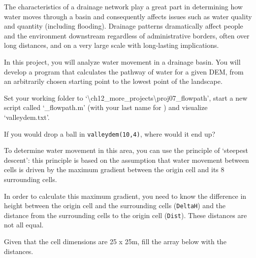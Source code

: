 \projectfooter{}



The characteristics of a drainage network play a great part in determining how water moves through a basin and consequently affects issues such as water quality and quantity (including flooding). Drainage patterns dramatically affect people and the environment downstream regardless of administrative borders, often over long distances, and on a very large scale with long-lasting implications. 

In this project, you will analyze water movement in a drainage basin. You will develop a program that calculates the pathway of water for a given DEM, from an arbitrarily chosen starting point to the lowest point of the landscape.
\begin{action}
Set your working folder to `\textbackslash{}ch12\_more\_projects\textbackslash{}proj07\_flowpath', start a new script called `\_flowpath.m' (with your last name for   ) and visualize `valleydem.txt'.
\end{action}
\begin{action}
If you would drop a ball in {\tt valleydem(10,4)}, where would it end up?
\end{action}
To determine water movement in this area, you can use the principle of `steepest descent': this principle is based on the assumption that water movement between cells is driven by the maximum gradient between the origin cell and its 8 surrounding cells.

In order to calculate this maximum gradient, you need to know the difference in height between the origin cell and the surrounding cells ({\tt DeltaH}) and the distance from the surrounding cells to the origin cell ({\tt Dist}). These distances are not all equal.
\begin{action}
Given that the cell dimensions are 25 x 25m, fill the array below with the distances.
\end{action}

